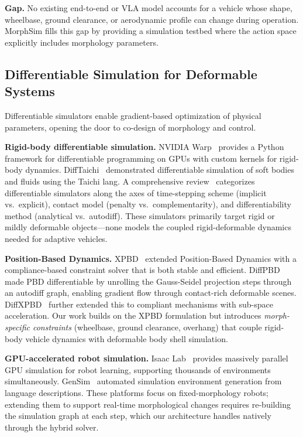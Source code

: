 \textbf{Gap.} No existing end-to-end or VLA model accounts for a vehicle whose shape, wheelbase, ground clearance, or aerodynamic profile can change during operation. MorphSim fills this gap by providing a simulation testbed where the action space explicitly includes morphology parameters.

\subsection{Differentiable Simulation for Deformable Systems}

Differentiable simulators enable gradient-based optimization of physical parameters, opening the door to co-design of morphology and control.

\textbf{Rigid-body differentiable simulation.}
NVIDIA Warp~\cite{warp2024} provides a Python framework for differentiable programming on GPUs with custom kernels for rigid-body dynamics. DiffTaichi~\cite{difftaichi2020} demonstrated differentiable simulation of soft bodies and fluids using the Taichi lang. A comprehensive review~\cite{diffsim_review2025} categorizes differentiable simulators along the axes of time-stepping scheme (implicit vs.\ explicit), contact model (penalty vs.\ complementarity), and differentiability method (analytical vs.\ autodiff). These simulators primarily target rigid or mildly deformable objects---none models the coupled rigid-deformable dynamics needed for adaptive vehicles.

\textbf{Position-Based Dynamics.}
XPBD~\cite{xpbd2012} extended Position-Based Dynamics with a compliance-based constraint solver that is both stable and efficient. DiffPBD~\cite{diffpbd2025} made PBD differentiable by unrolling the Gauss-Seidel projection steps through an autodiff graph, enabling gradient flow through contact-rich deformable scenes. DiffXPBD~\cite{diffxpbd2024} further extended this to compliant mechanisms with sub-space acceleration. Our work builds on the XPBD formulation but introduces \emph{morph-specific constraints} (wheelbase, ground clearance, overhang) that couple rigid-body vehicle dynamics with deformable body shell simulation.

\textbf{GPU-accelerated robot simulation.}
Isaac Lab~\cite{isaac_lab2024} provides massively parallel GPU simulation for robot learning, supporting thousands of environments simultaneously. GenSim~\cite{gensim2024} automated simulation environment generation from language descriptions. These platforms focus on fixed-morphology robots; extending them to support real-time morphological changes requires re-building the simulation graph at each step, which our architecture handles natively through the hybrid solver.

